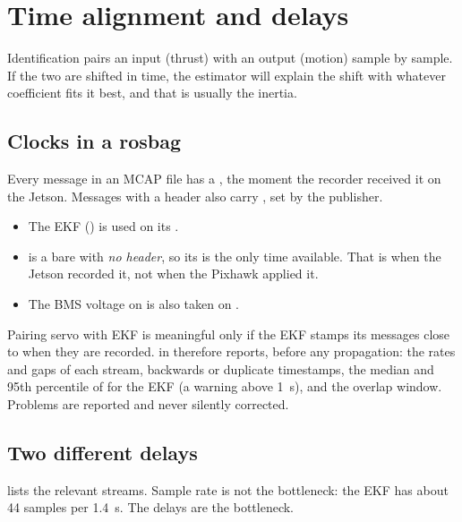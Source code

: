 \chapter{Time alignment and delays}
\label{ch:timing}

Identification pairs an input (thrust) with an output (motion) sample by sample. If the two
are shifted in time, the estimator will explain the shift with whatever coefficient fits it
best, and that is usually the inertia.

\section{Clocks in a rosbag}

Every message in an MCAP file has a , the moment the recorder received it on
the Jetson. Messages with a header also carry , set by the publisher.
\begin{itemize}
  \item The EKF () is used on its .
  \item {} is a bare  with \emph{no header},
        so its  is the only time available. That is when the Jetson
        recorded it, not when the Pixhawk applied it.
  \item The BMS voltage on  is also taken on .
\end{itemize}
Pairing servo  with EKF  is meaningful only if the EKF stamps
its messages close to when they are recorded.  in 
therefore reports, before any propagation: the rates and gaps of each stream, backwards or
duplicate timestamps, the median and 95th percentile of  for
the EKF (a warning above \qty{1}{\second}), and the overlap window. Problems are reported
and never silently corrected.

\section{Two different delays}

 lists the relevant streams. Sample rate is not the bottleneck: the EKF has
about 44 samples per \qty{1.4}{\second}. The delays are the bottleneck.

